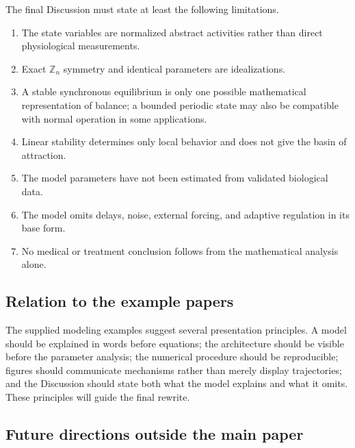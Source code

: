 \documentclass[11pt, reqno]{amsart}
\theoremstyle{definition}
\theoremstyle{remark}
\newcommand{\Z}{\mathbb{Z}}
\begin{document}
The final Discussion must state at least the following limitations.

\begin{enumerate}[label=(\arabic*),leftmargin=2.5em]
    \item The state variables are normalized abstract activities rather than
    direct physiological measurements.

    \item Exact $\Z_n$ symmetry and identical parameters are idealizations.

    \item A stable synchronous equilibrium is only one possible mathematical
    representation of balance; a bounded periodic state may also be compatible
    with normal operation in some applications.

    \item Linear stability determines only local behavior and does not give the
    basin of attraction.

    \item The model parameters have not been estimated from validated
    biological data.

    \item The model omits delays, noise, external forcing, and adaptive
    regulation in its base form.

    \item No medical or treatment conclusion follows from the mathematical
    analysis alone.
\end{enumerate}

\subsection{Relation to the example papers}

The supplied modeling examples suggest several presentation principles.  A
model should be explained in words before equations; the architecture should
be visible before the parameter analysis; the numerical procedure should be
reproducible; figures should communicate mechanisms rather than merely display
trajectories; and the Discussion should state both what the model explains and
what it omits.  These principles will guide the final rewrite.

\subsection{Future directions outside the main paper}
\end{document}

